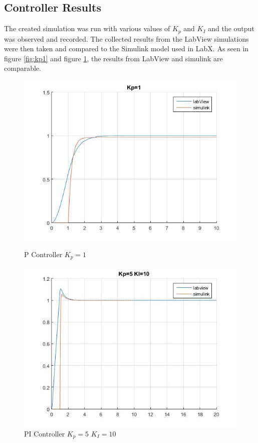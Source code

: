\documentclass[11pt,titlepage]{article}
\begin{document}
    \subsection{Controller Results}
        The created simulation was run with various values of $K_p$ and $K_I$ and the output was observed and recorded. The collected results from the LabView simulations were then taken and compared to the Simulink model used in LabX. As seen in figure \ref{fig:kp1} and figure \ref{fig:kp5KI10}, the results from LabView and simulink are comparable.
        \begin{figure}[h!]
            \centering
            \begin{minipage}{.5\textwidth}
                \centering
                \includegraphics[scale=.4]{Kp1}
                \caption{P Controller $K_p=1$}
                \label{fig:kp1}
            \end{minipage}%
            \begin{minipage}{.5\textwidth}
                \centering
                \includegraphics[scale=.4]{Kp5KI10}
                \caption{PI Controller $K_p=5$ $K_I=10$}
                \label{fig:kp5KI10}
            \end{minipage}%
        \end{figure}    
\end{document}
